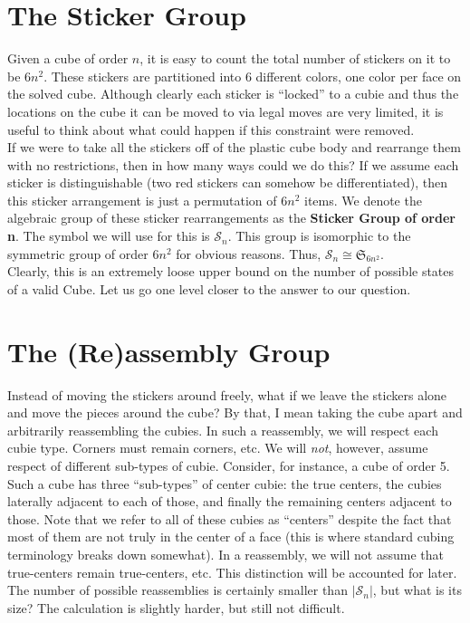 \documentclass[10pt,letterpaper]{report}
\begin{document}
\section{The Sticker Group}
Given a cube of order $n$, it is easy to count the total number of stickers on it to be $6n^2$.  These stickers are partitioned into 6 different colors, one color per face on the solved cube.  Although clearly each sticker is ``locked'' to a cubie and thus the locations on the cube it can be moved to via legal moves are very limited, it is useful to think about what could happen if this constraint were removed. \\

If we were to take all the stickers off of the plastic cube body and rearrange them with no restrictions, then in how many ways could we do this?  If we assume each sticker is distinguishable (two red stickers can somehow be differentiated), then this sticker arrangement is just a permutation of $6n^2$ items.  We denote the algebraic group of these sticker rearrangements as the \textbf{Sticker Group of order n}.  The symbol we will use for this is $\mathcal{S}_n$.  This group is isomorphic to the symmetric group of order $6n^2$ for obvious reasons.  Thus, $\mathcal{S}_n \cong \mathfrak{S}_{6n^2}$. \\

Clearly, this is an extremely loose upper bound on the number of possible states of a valid Cube.  Let us go one level closer to the answer to our question.

\section{The (Re)assembly Group}
Instead of moving the stickers around freely, what if we leave the stickers alone and move the pieces around the cube?  By that, I mean taking the cube apart and arbitrarily reassembling the cubies.  In such a reassembly, we will respect each cubie type.  Corners must remain corners, etc.  We will \textit{not}, however, assume respect of different sub-types of cubie.  Consider, for instance, a cube of order 5.  Such a cube has three ``sub-types'' of center cubie: the true centers, the cubies laterally adjacent to each of those, and finally the remaining centers adjacent to those.  Note that we refer to all of these cubies as ``centers'' despite the fact that most of them are not truly in the center of a face (this is where standard cubing terminology breaks down somewhat).  In a reassembly, we will not assume that true-centers remain true-centers, etc.  This distinction will be accounted for later.  The number of possible reassemblies is certainly smaller than $|\mathcal{S}_n|$, but what is its size?  The calculation is slightly harder, but still not difficult. \\
\end{document}
